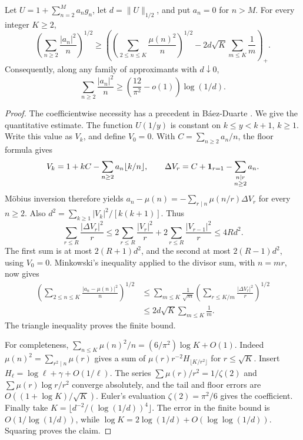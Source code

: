 \begin{theorem}\label{thm:adaptive}
Let \(U=1+\sum_{n=2}^M a_ng_n\), let \(d=\|U\|_{1/2}\), and put \(a_n=0\) for \(n>M\). For every integer \(K\ge2\),
\[
 \left(\sum_{n\ge2}\frac{|a_n|^2}{n}\right)^{1/2}
 \ge
 \left(\left(\sum_{2\le n\le K}\frac{\mu(n)^2}{n}\right)^{1/2}
            -2d\sqrt K\sum_{m\le K}\frac1m\right)_+ .
\]
Consequently, along any family of approximants with \(d\downarrow0\),
\[
 \sum_{n\ge2}\frac{|a_n|^2}{n}
 \ge\left(\frac{12}{\pi^2}-o(1)\right)\log(1/d).
\]
\end{theorem}
\begin{proof}
The coefficientwise necessity has a precedent in B\'aez-Duarte \cite[Lemma~4.2]{bd-arith}. We give the quantitative estimate. The function \(U(1/y)\) is constant on \(k\le y<k+1\), \(k\ge1\). Write this value as \(V_k\), and define \(V_0=0\). With \(C=\sum_{n\ge2}a_n/n\), the floor formula gives
\[
 V_k=1+kC-\sum_{n\ge2}a_n\lfloor k/n\rfloor,\qquad
 \Delta V_r=C+\mathbf 1_{r=1}-\sum_{\substack{n\mid r\\n\ge2}}a_n.
\]
M\"obius inversion therefore yields
\(a_n-\mu(n)=-\sum_{r\mid n}\mu(n/r)\Delta V_r\) for every \(n\ge2\).
Also \(d^2=\sum_{k\ge1}|V_k|^2/[k(k+1)]\). Thus
\[
 \sum_{r\le R}\frac{|\Delta V_r|^2}{r}
 \le 2\sum_{r\le R}\frac{|V_r|^2}{r}
       +2\sum_{r\le R}\frac{|V_{r-1}|^2}{r}
 \le4R d^2 .
\]
The first sum is at most \(2(R+1)d^2\), and the second at most \(2(R-1)d^2\), using \(V_0=0\). Minkowski's inequality applied to the divisor sum, with \(n=mr\), now gives
\begin{align*}
 \left(\sum_{2\le n\le K}\frac{|a_n-\mu(n)|^2}{n}\right)^{1/2}
 &\le\sum_{m\le K}\frac1{\sqrt m}
       \left(\sum_{r\le K/m}\frac{|\Delta V_r|^2}{r}\right)^{1/2}
 \\&\le2d\sqrt K\sum_{m\le K}\frac1m .
\end{align*}
The triangle inequality proves the finite bound.

For completeness,
\(\sum_{n\le K}\mu(n)^2/n=(6/\pi^2)\log K+O(1)\).
Indeed \(\mu(n)^2=\sum_{r^2\mid n}\mu(r)\) gives a sum of
\(\mu(r)r^{-2}H_{\lfloor K/r^2\rfloor}\) for \(r\le\sqrt K\). Insert \(H_\ell=\log\ell+\gamma+O(1/\ell)\). The series \(\sum\mu(r)/r^2=1/\zeta(2)\) and \(\sum\mu(r)\log r/r^2\) converge absolutely, and the tail and floor errors are \(O((1+\log K)/\sqrt K)\). Euler's evaluation \(\zeta(2)=\pi^2/6\) gives the coefficient. Finally take \(K=\lfloor d^{-2}/(\log(1/d))^4\rfloor\). The error in the finite bound is \(O(1/\log(1/d))\), while \(\log K=2\log(1/d)+O(\log\log(1/d))\). Squaring proves the claim.
\end{proof}

